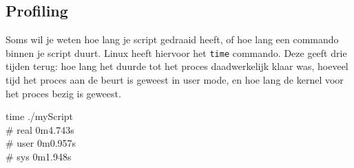 \subsection{Profiling}\label{profiling}

Soms wil je weten hoe lang je script gedraaid heeft, of hoe lang een commando binnen je script duurt. Linux heeft hiervoor het \texttt{time} commando. Deze geeft drie tijden terug: hoe lang het duurde tot het proces daadwerkelijk klaar was, hoeveel tijd het proces aan de beurt is geweest in user mode, en hoe lang de kernel voor het proces bezig is geweest.

\begin{bash}
\p time ./myScript\\
\# real    0m4.743s\\
\# user    0m0.957s\\
\# sys     0m1.948s\\
\end{bash}
